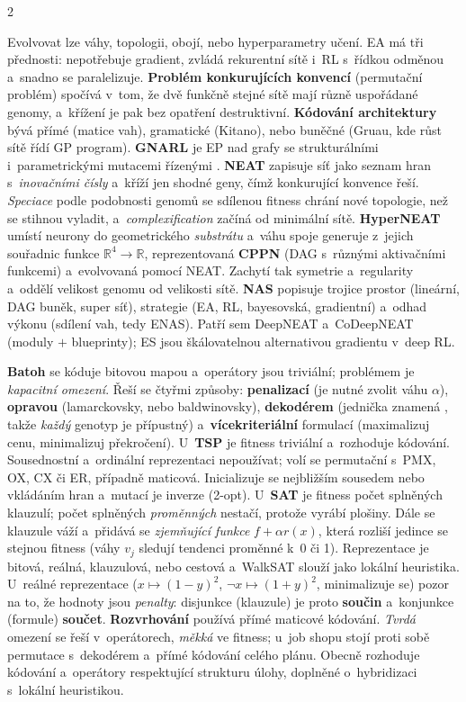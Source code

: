 \documentclass[10pt,a4paper]{article}
\newcommand{\hh}[1]{\par\smallskip\noindent{\bfseries\color{headcol}#1}\par\nobreak\vspace{-0.2em}}
\newcommand{\tm}[1]{\textbf{#1}}
\begin{document}
\begin{multicols}{2}
\hh{Neuroevoluce}
Evolvovat lze váhy, topologii, obojí, nebo hyperparametry učení. EA má tři přednosti: nepotřebuje
gradient, zvládá rekurentní sítě i~RL s~řídkou odměnou a~snadno se paralelizuje.
\tm{Problém konkurujících konvencí} (permutační problém) spočívá v~tom, že dvě funkčně stejné
sítě mají různě uspořádané genomy, a~křížení je pak bez opatření destruktivní.
\tm{Kódování architektury} bývá přímé (matice vah), gramatické (Kitano), nebo buněčné (Gruau,
kde růst sítě řídí GP program). \tm{GNARL} je EP nad grafy se strukturálními i~parametrickými
mutacemi řízenými .
\tm{NEAT} zapisuje síť jako seznam hran s~\emph{inovačními čísly} a~kříží jen shodné geny, čímž
konkurující konvence řeší. \emph{Speciace} podle podobnosti genomů se sdílenou fitness chrání
nové topologie, než se stihnou vyladit, a~\emph{complexification} začíná od minimální sítě.
\tm{HyperNEAT} umístí neurony do geometrického \emph{substrátu} a~váhu spoje generuje z~jejich
souřadnic funkce $\mathbb{R}^4\to\mathbb{R}$, reprezentovaná \tm{CPPN} (DAG s~různými aktivačními
funkcemi) a~evolvovaná pomocí NEAT. Zachytí tak symetrie a~regularity a~oddělí velikost genomu
od velikosti sítě.
\tm{NAS} popisuje trojice prostor (lineární, DAG buněk, super síť), strategie (EA, RL,
bayesovská, gradientní) a~odhad výkonu (sdílení vah, tedy ENAS). Patří sem DeepNEAT a~CoDeepNEAT
(moduly $+$ blueprinty); ES jsou škálovatelnou alternativou gradientu v~deep RL.

\hh{Kombinatorické úlohy}
\tm{Batoh} se kóduje bitovou mapou a~operátory jsou triviální; problémem je \emph{kapacitní
omezení}. Řeší se čtyřmi způsoby: \tm{penalizací} (je nutné zvolit váhu $\alpha$), \tm{opravou}
(lamarckovsky, nebo baldwinovsky), \tm{dekodérem} (jednička znamená ,
takže \emph{každý} genotyp je přípustný) a~\tm{vícekriteriální} formulací (maximalizuj cenu,
minimalizuj překročení).
U~\tm{TSP} je fitness triviální a~rozhoduje kódování. Sousednostní a~ordinální reprezentaci
nepoužívat; volí se permutační s~PMX, OX, CX či ER, případně maticová. Inicializuje se nejbližším
sousedem nebo vkládáním hran a~mutací je inverze (2-opt).
U~\tm{SAT} je fitness počet splněných klauzulí; počet splněných \emph{proměnných} nestačí,
protože vyrábí plošiny. Dále se klauzule váží a~přidává se \emph{zjemňující funkce}
$f+\alpha r(x)$, která rozliší jedince se stejnou fitness (váhy $v_j$ sledují tendenci proměnné
k~0 či 1). Reprezentace je bitová, reálná, klauzulová, nebo cestová a~WalkSAT slouží jako lokální
heuristika. U~reálné reprezentace ($x\mapsto(1-y)^2$, $\neg x\mapsto(1+y)^2$, minimalizuje se)
pozor na to, že hodnoty jsou \emph{penalty}: disjunkce (klauzule) je proto \tm{součin}
a~konjunkce (formule) \tm{součet}.
\tm{Rozvrhování} používá přímé maticové kódování. \emph{Tvrdá} omezení se řeší v~operátorech,
\emph{měkká} ve fitness; u~job shopu stojí proti sobě permutace s~dekodérem a~přímé kódování
celého plánu.
Obecně rozhoduje kódování a~operátory respektující strukturu úlohy, doplněné o~hybridizaci
s~lokální heuristikou.


\end{multicols}
\end{document}

